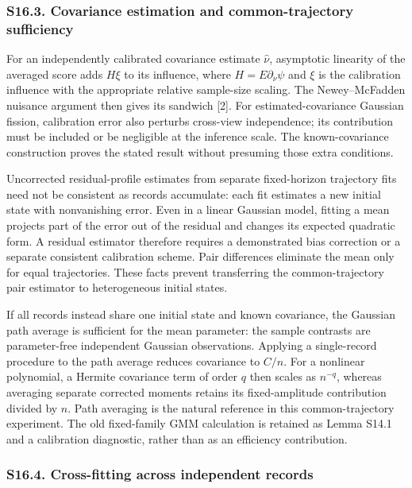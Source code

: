 \documentclass[
  american,
  11pt,
]{article}
\begin{document}
\subsubsection{S16.3. Covariance estimation and common-trajectory
sufficiency}\label{s16.3.-covariance-estimation-and-common-trajectory-sufficiency}

For an independently calibrated covariance estimate \(\widehat\nu\),
asymptotic linearity of the averaged score adds \(H\xi\) to its
influence, where \(H=E\partial_\nu\psi\) and \(\xi\) is the calibration
influence with the appropriate relative sample-size scaling. The
Newey--McFadden nuisance argument then gives its sandwich {[}2{]}. For
estimated-covariance Gaussian fission, calibration error also perturbs
cross-view independence; its contribution must be included or be
negligible at the inference scale. The known-covariance construction
proves the stated result without presuming those extra conditions.

Uncorrected residual-profile estimates from separate fixed-horizon
trajectory fits need not be consistent as records accumulate: each fit
estimates a new initial state with nonvanishing error. Even in a linear
Gaussian model, fitting a mean projects part of the error out of the
residual and changes its expected quadratic form. A residual estimator
therefore requires a demonstrated bias correction or a separate
consistent calibration scheme. Pair differences eliminate the mean only
for equal trajectories. These facts prevent transferring the
common-trajectory pair estimator to heterogeneous initial states.

If all records instead share one initial state and known covariance, the
Gaussian path average is sufficient for the mean parameter: the sample
contrasts are parameter-free independent Gaussian observations. Applying
a single-record procedure to the path average reduces covariance to
\(C/n\). For a nonlinear polynomial, a Hermite covariance term of order
\(q\) then scales as \(n^{-q}\), whereas averaging separate corrected
moments retains its fixed-amplitude contribution divided by \(n\). Path
averaging is the natural reference in this common-trajectory experiment.
The old fixed-family GMM calculation is retained as Lemma S14.1 and a
calibration diagnostic, rather than as an efficiency contribution.

\subsubsection{S16.4. Cross-fitting across independent
records}\label{s16.4.-cross-fitting-across-independent-records}
\end{document}
